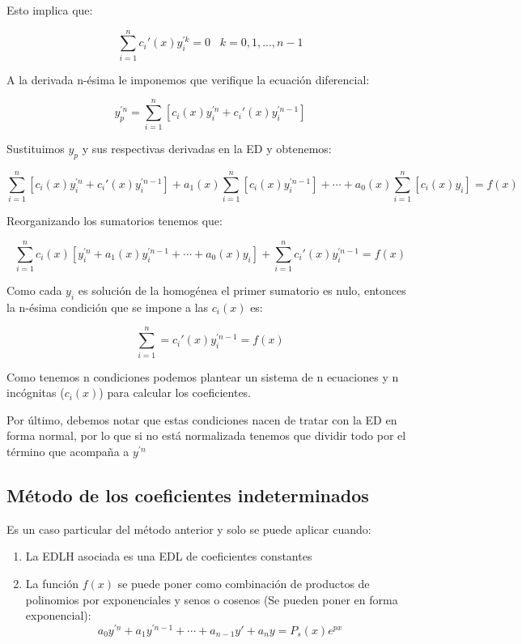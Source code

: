 \documentclass[a4paper,12pt,titlepage]{article}
\begin{document}
Esto implica que:

\begin{equation}
    \sum_{i=1}^{n} c_i'(x) y_i^{'k}= 0 \;\;\; k = 0,1,...,n-1
\end{equation}

A la derivada n-ésima le imponemos que verifique la ecuación diferencial:

\begin{equation}
    y_p^{'n}  = \sum_{i =1}^{n} [c_i(x)y_i^{'n} + c_i'(x)y_i^{'n-1}]
\end{equation}

Sustituimos $y_p$ y sus respectivas derivadas en la ED y obtenemos:

\begin{equation}
    \sum_{i = 1}^{n} [c_i(x)y_i^{'n} + c_i'(x)y_i^{'n-1}] + a_1(x) \sum_{i=1}^{n} [c_i(x)y_i^{'n-1}] + \cdots + a_0(x) \sum_{i=1}^{n} [c_i(x)y_i] = f(x)
\end{equation}

Reorganizando los sumatorios tenemos que:

\begin{equation}
    \sum_{i=1}^{n} c_i(x)[y_i^{'n} + a_1(x)y_i^{'n-1} + \cdots + a_0(x)y_i] + \sum_{i=1}^{n} c_i'(x)y_i^{'n-1} = f(x)
\end{equation}

Como cada $y_i$ es solución de la homogénea el primer sumatorio es nulo, entonces la n-ésima condición que se impone a las $c_i(x)$ es:

\begin{equation}
    \sum_{i=1}^{n} = c_i'(x)y_i^{'n-1} = f(x)
\end{equation}

Como tenemos n condiciones podemos plantear un sistema de n ecuaciones y n incógnitas ($c_i(x)$) para calcular los coeficientes.

\par Por último, debemos notar que estas condiciones nacen de tratar con la ED en forma normal, por lo que si no está normalizada tenemos que dividir todo por el término que acompaña a $y^{'n}$


\subsection{Método de los coeficientes indeterminados}

Es un caso particular del método anterior y solo se puede aplicar cuando:

\begin{enumerate}
    \item La EDLH asociada es una EDL de coeficientes constantes
    \item La función $f(x)$ se puede poner como combinación de productos de polinomios por exponenciales y senos o cosenos (Se pueden poner en forma exponencial):
    \begin{equation}
        a_0y^{'n} + a_1y^{'n-1} + \cdots + a_{n-1}y' + a_ny = P_s(x) e^{px} 
    \end{equation}
\end{enumerate}
\end{document}

